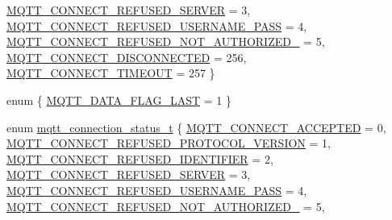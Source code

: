 \begin{DoxyCompactItemize}
\hyperlink{group__mqtt_gga8cf0f360ab20343af37e1d124395a77dade28ec1c2ce3d874e91251d683c92b2a}{M\+Q\+T\+T\+\_\+\+C\+O\+N\+N\+E\+C\+T\+\_\+\+R\+E\+F\+U\+S\+E\+D\+\_\+\+S\+E\+R\+V\+ER} = 3, 
\newline
\hyperlink{group__mqtt_gga8cf0f360ab20343af37e1d124395a77da290cf9037054c42022cc864cfade896a}{M\+Q\+T\+T\+\_\+\+C\+O\+N\+N\+E\+C\+T\+\_\+\+R\+E\+F\+U\+S\+E\+D\+\_\+\+U\+S\+E\+R\+N\+A\+M\+E\+\_\+\+P\+A\+SS} = 4, 
\hyperlink{group__mqtt_gga8cf0f360ab20343af37e1d124395a77dafc4888158dd6ee84269a5f0bfdc12b17}{M\+Q\+T\+T\+\_\+\+C\+O\+N\+N\+E\+C\+T\+\_\+\+R\+E\+F\+U\+S\+E\+D\+\_\+\+N\+O\+T\+\_\+\+A\+U\+T\+H\+O\+R\+I\+Z\+E\+D\+\_\+} = 5, 
\hyperlink{group__mqtt_gga8cf0f360ab20343af37e1d124395a77da321f5ce31b173f235de1a517fcfd00dd}{M\+Q\+T\+T\+\_\+\+C\+O\+N\+N\+E\+C\+T\+\_\+\+D\+I\+S\+C\+O\+N\+N\+E\+C\+T\+ED} = 256, 
\hyperlink{group__mqtt_gga8cf0f360ab20343af37e1d124395a77da57153f2ab4331c6f76a9ee74e1bcfc62}{M\+Q\+T\+T\+\_\+\+C\+O\+N\+N\+E\+C\+T\+\_\+\+T\+I\+M\+E\+O\+UT} = 257
 \}
\item 
enum \{ \hyperlink{group__mqtt_gga06fc87d81c62e9abb8790b6e5713c55ba79cd00d0a5a8df13207e0c49447df87f}{M\+Q\+T\+T\+\_\+\+D\+A\+T\+A\+\_\+\+F\+L\+A\+G\+\_\+\+L\+A\+ST} = 1
 \}
\item 
enum \hyperlink{group__mqtt_ga8cf0f360ab20343af37e1d124395a77d}{mqtt\+\_\+connection\+\_\+status\+\_\+t} \{ \newline
\hyperlink{group__mqtt_gga8cf0f360ab20343af37e1d124395a77da074dc1d289b8e8d4aad91f6a2cb93dc1}{M\+Q\+T\+T\+\_\+\+C\+O\+N\+N\+E\+C\+T\+\_\+\+A\+C\+C\+E\+P\+T\+ED} = 0, 
\hyperlink{group__mqtt_gga8cf0f360ab20343af37e1d124395a77da41f8aa97142be337cb639f94d9145190}{M\+Q\+T\+T\+\_\+\+C\+O\+N\+N\+E\+C\+T\+\_\+\+R\+E\+F\+U\+S\+E\+D\+\_\+\+P\+R\+O\+T\+O\+C\+O\+L\+\_\+\+V\+E\+R\+S\+I\+ON} = 1, 
\hyperlink{group__mqtt_gga8cf0f360ab20343af37e1d124395a77da28ffe49b0175adaa2b9a27cb4873224a}{M\+Q\+T\+T\+\_\+\+C\+O\+N\+N\+E\+C\+T\+\_\+\+R\+E\+F\+U\+S\+E\+D\+\_\+\+I\+D\+E\+N\+T\+I\+F\+I\+ER} = 2, 
\hyperlink{group__mqtt_gga8cf0f360ab20343af37e1d124395a77dade28ec1c2ce3d874e91251d683c92b2a}{M\+Q\+T\+T\+\_\+\+C\+O\+N\+N\+E\+C\+T\+\_\+\+R\+E\+F\+U\+S\+E\+D\+\_\+\+S\+E\+R\+V\+ER} = 3, 
\newline
\hyperlink{group__mqtt_gga8cf0f360ab20343af37e1d124395a77da290cf9037054c42022cc864cfade896a}{M\+Q\+T\+T\+\_\+\+C\+O\+N\+N\+E\+C\+T\+\_\+\+R\+E\+F\+U\+S\+E\+D\+\_\+\+U\+S\+E\+R\+N\+A\+M\+E\+\_\+\+P\+A\+SS} = 4, 
\hyperlink{group__mqtt_gga8cf0f360ab20343af37e1d124395a77dafc4888158dd6ee84269a5f0bfdc12b17}{M\+Q\+T\+T\+\_\+\+C\+O\+N\+N\+E\+C\+T\+\_\+\+R\+E\+F\+U\+S\+E\+D\+\_\+\+N\+O\+T\+\_\+\+A\+U\+T\+H\+O\+R\+I\+Z\+E\+D\+\_\+} = 5, 

\end{DoxyCompactItemize}
